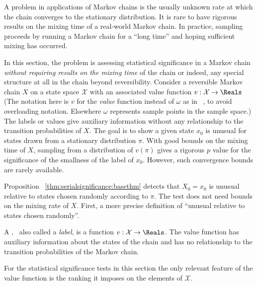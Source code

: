 \documentclass[12pt]{article}
\begin{document}
A problem in applications of Markov chains is the usually unknown rate
at which the chain converges to the stationary distribution.  It is rare
to have rigorous results on the mixing time of a real-world Markov
chain.  In practice, sampling proceeds by running a Markov chain for a
``long time'' and hoping sufficient mixing has occurred.

In this section, the problem is assessing statistical significance in a
Markov chain \emph{without requiring results on the mixing time} of the
chain or indeed, any special structure at all in the chain beyond
reversibility.  Consider a reversible Markov chain \( X \) on a state
space \( \mathcal{X} \) with an associated value function \( v :
\mathcal{X} \to \Reals \) (The notation here is \( v \) for the \emph{value}
function instead of \( \omega \) as in~%
\cite{Chikina2860}, to avoid overloading notation.  Elsewhere \( \omega \)
represents sample points in the sample space.) The labels or values give
auxiliary information without  any relationship to the
transition probabilities of \( X \).  The goal is to show a given state \(
x_0 \) is unusual for states drawn from a stationary distribution \( \pi
\).  With good bounds on the mixing time of \( X \), sampling from a
distribution of \( v(\pi) \) gives a rigorous \( p \) value for the
significance of the smallness of the label of \( x_0 \). However, such
convergence bounds are rarely available.

Proposition~%
\ref{thm:serialsignificance:basethm} detects that \( X_0 = x_0 \) is unusual
relative to states chosen randomly according to \( \pi \).  The test
does not need bounds on the mixing rate of \( X \).  First, a more
precise definition of ``unusual relative to states chosen randomly''.

\begin{definition}
    A ,~%
    also called a \emph{label}, is a function \( v :  \mathcal{X} \to
    \Reals \).  The value function has auxiliary information about the
    states of the chain and has no relationship to the transition
    probabilities of the Markov chain.
\end{definition}

\begin{remark}
    For the statistical significance tests in this section the only
    relevant feature of the value function is the ranking it imposes on
    the elements of \( \mathcal{X} \).
\end{remark}
\end{document}

